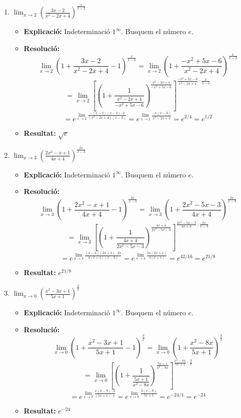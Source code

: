 \documentclass[12pt,a4paper]{article}
\begin{document}
\begin{enumerate}[label=\textbf{7.\arabic*.}]
    \item $\lim_{x \to 2} \left( \frac{3x-2}{x^2-2x+4} \right)^{\frac{x}{x-2}}$
        \begin{itemize}
            \item \textbf{Explicació:} Indeterminació $1^\infty$. Busquem el número $e$.
            \item \textbf{Resolució:}
            $$ \lim_{x \to 2} \left( 1 + \frac{3x-2}{x^2-2x+4} - 1 \right)^{\frac{x}{x-2}} = \lim_{x \to 2} \left( 1 + \frac{-x^2+5x-6}{x^2-2x+4} \right)^{\frac{x}{x-2}} $$
            $$ = \lim_{x \to 2} \left[ \left( 1 + \frac{1}{\frac{x^2-2x+4}{-x^2+5x-6}} \right)^{\frac{x^2-2x+4}{-x^2+5x-6}} \right]^{\frac{-x^2+5x-6}{x^2-2x+4} \cdot \frac{x}{x-2}} $$
            $$ = e^{\lim_{x \to 2} \frac{-(x-2)(x-3) \cdot x}{(x^2-2x+4)(x-2)}} = e^{\lim_{x \to 2} \frac{-x(x-3)}{x^2-2x+4}} = e^{2/4} = e^{1/2} $$
            \item \textbf{Resultat:} $\sqrt{e}$
        \end{itemize}

    \item $\lim_{x \to 3} \left( \frac{2x^2-x+1}{4x+4} \right)^{\frac{2x}{x-3}}$
        \begin{itemize}
            \item \textbf{Explicació:} Indeterminació $1^\infty$. Busquem el número $e$.
            \item \textbf{Resolució:}
            $$ \lim_{x \to 3} \left( 1 + \frac{2x^2-x+1}{4x+4} - 1 \right)^{\frac{2x}{x-3}} = \lim_{x \to 3} \left( 1 + \frac{2x^2-5x-3}{4x+4} \right)^{\frac{2x}{x-3}} $$
            $$ = \lim_{x \to 3} \left[ \left( 1 + \frac{1}{\frac{4x+4}{2x^2-5x-3}} \right)^{\frac{4x+4}{2x^2-5x-3}} \right]^{\frac{2x^2-5x-3}{4x+4} \cdot \frac{2x}{x-3}} $$
            $$ = e^{\lim_{x \to 3} \frac{(x-3)(2x+1) \cdot 2x}{4(x+1)(x-3)}} = e^{\lim_{x \to 3} \frac{2x(2x+1)}{4(x+1)}} = e^{42/16} = e^{21/8} $$
            \item \textbf{Resultat:} $e^{21/8}$
        \end{itemize}

    \item $\lim_{x \to 0} \left( \frac{x^2-3x+1}{5x+1} \right)^{\frac{3}{x}}$
        \begin{itemize}
            \item \textbf{Explicació:} Indeterminació $1^\infty$. Busquem el número $e$.
            \item \textbf{Resolució:}
            $$ \lim_{x \to 0} \left( 1 + \frac{x^2-3x+1}{5x+1} - 1 \right)^{\frac{3}{x}} = \lim_{x \to 0} \left( 1 + \frac{x^2-8x}{5x+1} \right)^{\frac{3}{x}} $$
            $$ = \lim_{x \to 0} \left[ \left( 1 + \frac{1}{\frac{5x+1}{x^2-8x}} \right)^{\frac{5x+1}{x^2-8x}} \right]^{\frac{x^2-8x}{5x+1} \cdot \frac{3}{x}} $$
            $$ = e^{\lim_{x \to 0} \frac{x(x-8) \cdot 3}{(5x+1) \cdot x}} = e^{\lim_{x \to 0} \frac{3(x-8)}{5x+1}} = e^{-24/1} = e^{-24} $$
            \item \textbf{Resultat:} $e^{-24}$
        \end{itemize}


\end{enumerate}
\end{document}
